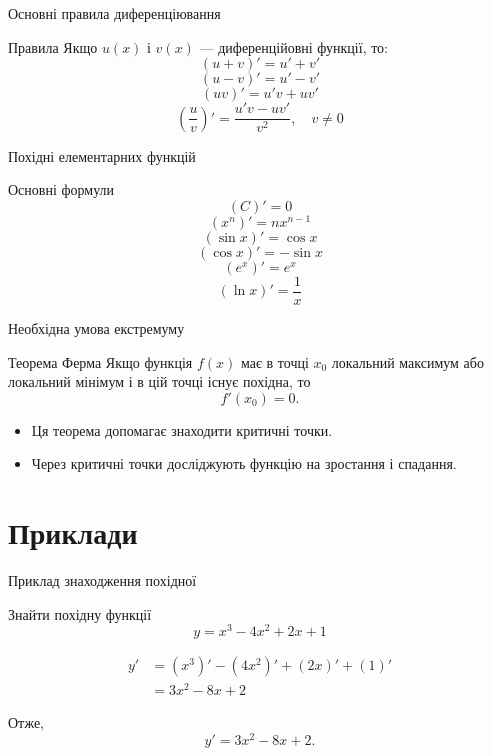 \documentclass{beamer}
\begin{document}
\begin{frame}{Основні правила диференціювання}
    \begin{block}{Правила}
        Якщо $u(x)$ і $v(x)$ — диференційовні функції, то:
        \[
        (u+v)'=u'+v'
        \]
        \[
        (u-v)'=u'-v'
        \]
        \[
        (uv)'=u'v+uv'
        \]
        \[
        \left(\frac{u}{v}\right)'=\frac{u'v-uv'}{v^2}, \quad v \ne 0
        \]
    \end{block}
\end{frame}

\begin{frame}{Похідні елементарних функцій}
    \begin{exampleblock}{Основні формули}
        \[
        (C)'=0
        \]
        \[
        (x^n)'=nx^{n-1}
        \]
        \[
        (\sin x)'=\cos x
        \]
        \[
        (\cos x)'=-\sin x
        \]
        \[
        (e^x)'=e^x
        \]
        \[
        (\ln x)'=\frac{1}{x}
        \]
    \end{exampleblock}
\end{frame}

\begin{frame}{Необхідна умова екстремуму}
    \begin{block}{Теорема Ферма}
        Якщо функція $f(x)$ має в точці $x_0$ локальний максимум або локальний мінімум і в цій точці існує похідна, то
        \[
        f'(x_0)=0.
        \]
    \end{block}

    \begin{itemize}
        \item Ця теорема допомагає знаходити критичні точки.
        \item Через критичні точки досліджують функцію на зростання і спадання.
    \end{itemize}
\end{frame}

\section{Приклади}
\begin{frame}{Приклад знаходження похідної}
    \begin{exampleblock}{Знайти похідну функції}
        \[
        y = x^3 - 4x^2 + 2x + 1
        \]
    \end{exampleblock}

    \begin{align*}
        y' &= (x^3)' - (4x^2)' + (2x)' + (1)' \\
           &= 3x^2 - 8x + 2
    \end{align*}

    Отже,
    \[
    y' = 3x^2 - 8x + 2.
    \]
\end{frame}
\end{document}
